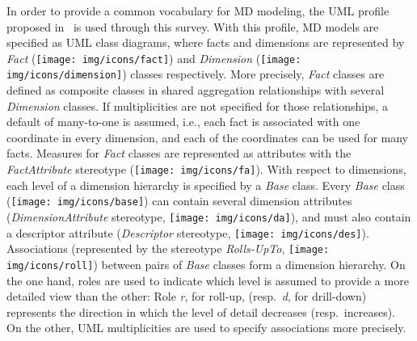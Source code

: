 In order to provide a common vocabulary for MD modeling, the UML
profile proposed in~\cite{DBLP:journals/dke/Lujan-MoraTS06} is used
through this survey.  With this profile, MD models are specified as
UML class diagrams, where facts and dimensions are represented by
\textit{Fact} (\texttt{[image: img/icons/fact]}) and
\textit{Dimension}
(\texttt{[image: img/icons/dimension]}) classes
respectively. More precisely, \textit{Fact} classes are defined as
composite classes in shared aggregation relationships with several
\textit{Dimension} classes.  If multiplicities are not specified for
those relationships, a default of many-to-one is assumed, i.e., each
fact is associated with one coordinate in every dimension, and each
of the coordinates can be used for many facts. Measures for
\textit{Fact} classes are represented as attributes with the
\textit{FactAttribute} stereotype
(\texttt{[image: img/icons/fa]}).  With respect to
dimensions, each level of a dimension hierarchy is specified by a
\textit{Base} class.  Every \textit{Base} class
(\texttt{[image: img/icons/base]}) can contain several
dimension attributes (\textit{DimensionAttribute} stereotype,
\texttt{[image: img/icons/da]}), and must also contain a
descriptor attribute (\textit{Descriptor} stereotype,
\texttt{[image: img/icons/des]}).
 Associations (represented by the stereotype
\textit{Rolls-UpTo}, \texttt{[image: img/icons/roll]})
between pairs of \textit{Base} classes form a dimension hierarchy.
On the one hand, roles are used to indicate which level is assumed
to provide a more detailed view than the other: Role \textit{r}, for
roll-up, (resp.~\textit{d}, for drill-down) represents the direction
in which the level of detail decreases (resp.~increases).  On the
other, UML multiplicities are used to specify associations more
precisely.



